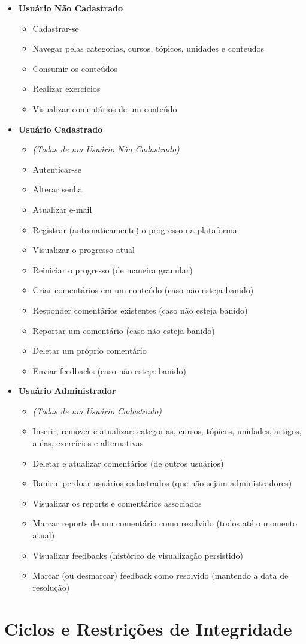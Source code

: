 \begin{itemize}
  \item \textbf{Usuário Não Cadastrado}
        \begin{itemize}
          \item Cadastrar-se
          \item Navegar pelas categorias, cursos, tópicos, unidades e conteúdos
          \item Consumir os conteúdos
          \item Realizar exercícios
          \item Visualizar comentários de um conteúdo
        \end{itemize}
  \item \textbf{Usuário Cadastrado}
        \begin{itemize}
          \item \textit{(Todas de um Usuário Não Cadastrado)}
          \item Autenticar-se
          \item Alterar senha
          \item Atualizar e-mail
          \item Registrar (automaticamente) o progresso na plataforma
          \item Visualizar o progresso atual
          \item Reiniciar o progresso (de maneira granular)
          \item Criar comentários em um conteúdo (caso não esteja banido)
          \item Responder comentários existentes (caso não esteja banido)
          \item Reportar um comentário (caso não esteja banido)
          \item Deletar um próprio comentário
          \item Enviar feedbacks (caso não esteja banido)
        \end{itemize}
  \item \textbf{Usuário Administrador}
        \begin{itemize}
          \item \textit{(Todas de um Usuário Cadastrado)}
          \item Inserir, remover e atualizar: categorias, cursos, tópicos, unidades, artigos,
                aulas, exercícios e alternativas
          \item Deletar e atualizar comentários (de outros usuários)
          \item Banir e perdoar usuários cadastrados (que não sejam administradores)
          \item Visualizar os reports e comentários associados
          \item Marcar reports de um comentário como resolvido (todos até o momento atual)
          \item Visualizar feedbacks (histórico de visualização persistido)
          \item Marcar (ou desmarcar) feedback como resolvido (mantendo a data de resolução)
        \end{itemize}
\end{itemize}


\section{Ciclos e Restrições de Integridade}
